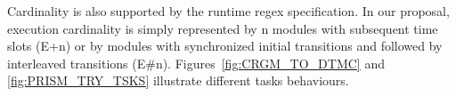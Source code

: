 Cardinality is also supported by the runtime regex specification. In our proposal, execution cardinality is simply represented by n modules with subsequent time slots (E+n) or by modules with synchronized initial transitions and followed by interleaved transitions (E\#n). Figures~\ref{fig:CRGM_TO_DTMC} and \ref{fig:PRISM_TRY_TSKS} illustrate different tasks behaviours.




